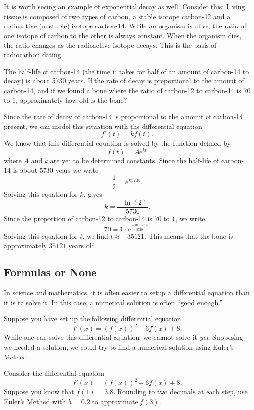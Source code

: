 It is worth seeing an example of exponential decay as well. Consider
this: Living tissue is composed of two types of carbon, a stable
isotope carbon-12 and a radioactive (unstable) isotope
carbon-14. While an organism is alive, the ratio of one isotope of
carbon to the other is always constant. When the organism dies, the
ratio changes as the radioactive isotope decays. This is the basis of
radiocarbon dating.


\begin{example}
The half-life of carbon-14 (the time it takes for half of an amount of
carbon-14 to decay) is about 5730 years. If the rate of decay is
proportional to the amount of carbon-14, and if we found a bone where
the ratio of carbon-12 to carbon-14 is $70$ to $1$, approximately how
old is the bone?
\end{example}

\begin{solution}
Since the rate of decay of carbon-14 is proportional to the amount of
carbon-14 present, we can model this situation with the differential equation
\[
f'(t) = k f(t).
\]
We know that this differential equation is solved by the function
defined by
\[
f(t) = A e^{kt}
\]
where $A$ and $k$ are yet to be determined constants. Since the
half-life of carbon-14 is about $5730$ years we write
\[
\frac{1}{2} = e^{k 5730}.
\]
Solving this equation for $k$, gives
\[
k = \frac{-\ln(2)}{5730}.
\]
Since the proportion of carbon-12 to carbon-14 is $70$ to $1$, we write
\[
70 = 1\cdot e^{\frac{-\ln(2)t}{5730}}.
\]
Solving this equation for $t$, we find $t \approx -35121$. This means
that the bone is approximately $35121$ years old.
\end{solution}


\subsection*{Formulas or None}

In science and mathematics, it is often easier to setup a differential
equation than it is to solve it. In this case, a numerical
solution is often ``good enough.''

Suppose you have set up the following differential equation
\[
f'(x) = \left(f(x)\right)^2 - 6f(x) + 8.
\]
While one can solve this differential equation, we cannot solve it
\textit{yet}. Supposing we needed a solution, we could try to find a
numerical solution using Euler's Method.

\begin{example}\label{example:slopefield1}
Consider the differential equation
\[
f'(x) = \left(f(x)\right)^2 - 6f(x) + 8.
\]
Suppose you know that $f(1)= 3.8$. Rounding to two decimals at each
step, use Euler's Method with $h=0.2$ to approximate $f(3)$. 
\end{example}

